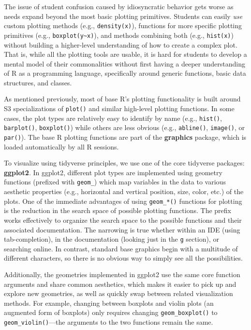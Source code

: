 \documentclass[12pt]{article}
\begin{document}
The issue of student confusion caused by idiosyncratic behavior gets
worse as needs expand beyond the most basic plotting primitives.
Students can easily \emph{use} custom plotting methods (e.g.,
\texttt{density(x)}), functions for more specific plotting primitives
(e.g., \texttt{boxplot(y\textasciitilde{}x)}), and methods combining
both (e.g., \texttt{hist(x)}) without building a higher-level
understanding of how to create a complex plot. That is, while all the
plotting tools are usable, it is hard for students to develop a mental
model of their commonalities without first having a deeper understanding
of R as a programming language, specifically around generic functions,
basic data structures, and classes.

As mentioned previously, most of base R's plotting functionality is
built around S3 specializations of \texttt{plot()} and similar
high-level plotting functions. In some cases, the plot types are
relatively easy to identify by name (e.g., \texttt{hist()},
\texttt{barplot()}, \texttt{boxplot()}) while others are less obvious
(e.g., \texttt{abline()}, \texttt{image()}, or \texttt{par()}). The base
R plotting functions are part of the \textbf{graphics} package, which is
loaded automatically by all R sessions.

To visualize using tidyverse principles, we use one of the core
tidyverse packages: \textbf{ggplot2}. In ggplot2, different plot types
are implemented using geometry functions (prefixed with \texttt{geom\_})
which map variables in the data to various aesthetic properties (e.g.,
horizontal and vertical position, size, color, etc.) of the plots. One
of the immediate advantages of using \texttt{geom\_*()} functions for
plotting is the reduction in the search space of possible plotting
functions. The prefix works effectively to organize the search space to
the possible functions and their associated documentation. The narrowing
is true whether within an IDE (using tab-completion), in the
documentation (looking just in the \texttt{g} section), or searching
online. In contrast, standard base graphics begin with a multitude of
different characters, so there is no obvious way to simply see all the
possibilities.

Additionally, the geometries implemented in ggplot2 use the same core
function arguments and share common aesthetics, which makes it easier to
pick up and explore new geometries, as well as quickly swap between
related visualization methods. For example, changing between boxplots
and violin plots (an augmented form of boxplots) only requires changing
\texttt{geom\_boxplot()} to \texttt{geom\_violin()}---the arguments to
the two functions remain the same.
\end{document}
